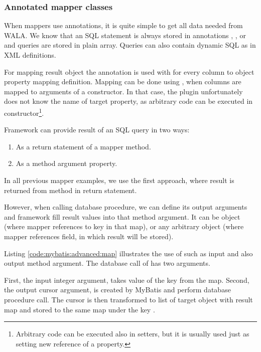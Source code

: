 \subsubsection{Annotated mapper classes}

When mappers use annotations, it is quite simple to get all data needed
from WALA. We know that an SQL statement is always stored in annotations
, ,  or 
and queries are stored in plain  array.
Queries can also contain dynamic SQL as in XML definitions.

For mapping result object the  annotation is used with 
for every column to object property mapping definition.
Mapping can be done using , when columns are mapped
to arguments of a constructor. In that case, the plugin unfortunately does not know
the name of target property, as arbitrary code can be executed in constructor\footnote{
  Arbitrary code can be executed also in setters, but it is usually used
  just as setting new reference of a property.
}.

Framework can provide result of an SQL query in two ways:
\begin{enumerate}
  \item As a return statement of a mapper method.
  \item As a method argument property.
\end{enumerate}

In all previous mapper examples, we use the first approach, where result
is returned from method in return statement.

However, when calling database procedure, we can define its output arguments
and framework fill result values into that method argument.
It can be  object (where mapper references to key in that map),
or any arbitrary object (where mapper references field, in which result will be stored).

Listing \ref{code:mybatis:advanced:map} illustrates the use of such  as
input and also output method argument.
The database call of  has two arguments.

First, the input integer argument, takes value of the  key from the map.
Second, the output cursor argument, is created by MyBatis and perform database procedure call.
The cursor is then transformed to list of target object
with result map  and stored to the same map under the key .


